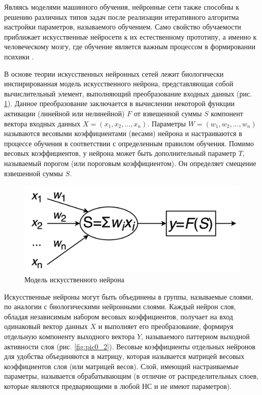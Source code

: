 Являясь моделями машинного обучения, нейронные сети также способны к решению различных типов задач после реализации итеративного алгоритма настройки параметров, называемого обучением. Само свойство обучаемости приближает искусственные нейросети к их естественному прототипу, а именно к человеческому мозгу, где обучение является важным процессом в формировании психики \cite{kandel}.

В основе теории искусственных нейронных сетей лежит биологически инспирированная модель искусственного нейрона, представляющая собой вычислительный элемент, выполняющий преобразование входных данных (рис. \ref{fig:pic0_1}). Данное преобразование заключается в вычислении некоторой функции активации (линейной или нелинейной) $F$ от взвешенной суммы $S$ компонент вектора входных данных $X = (x_1, x_2, ..., x_n)$. Параметры $W = (w_1, w_2, ..., w_n)$ называются весовыми коэффициентами (весами) нейрона и настраиваются в процессе обучения в соответствии с определенным правилом обучения. Помимо весовых коэффициентов, у нейрона может быть дополнительный параметр $T$, называемый порогом (или пороговым коэффициентом). Он определяет смещение взвешенной суммы $S$.

\begin{figure}[H]
  \centering
  \includegraphics[width=\textwidth]{man-source/images/ch1/pic0-1.png}
  \caption{Модель искусственного нейрона}
  \label{fig:pic0_1}
\end{figure}

Искусственные нейроны могут быть объединены в группы, называемые слоями, по аналогии с биологическими нейронными слоями. Каждый нейрон слоя, обладая независимым набором весовых коэффициентов, получает на вход одинаковый вектор данных $X$ и выполняет его преобразование, формируя отдельную компоненту выходного вектора $Y$, называемого паттерном выходной активности слоя \cite{golovko2017} (рис. \ref{fig:pic0_2}). Весовые коэффициенты отдельных нейронов для удобства объединяются в матрицу, которая называется матрицей весовых коэффициентов слоя (или матрицей весов). Слой, имеющий настраиваемые параметры, называется обрабатывающим (в отличие от распределительных слоев, которые являются предваряющими в любой НС и не имеют параметров).

